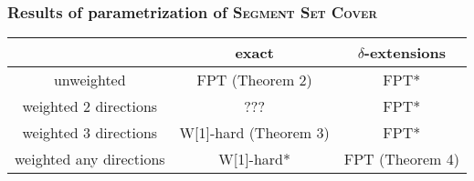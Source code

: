 \documentclass{beamer}
\begin{document}
\begin{frame}
\frametitle{Results of parametrization of \textsc{Segment Set Cover}}

\begin{tabular}{|c|c|c|}
\hline
           & exact & $\delta$-extensions \\
\hline
unweighted & \textcolor{olivegreen}{FPT (Theorem 2)} & \textcolor{olivegreen}{FPT*} \\
\hline
weighted 2 directions & ??? & \textcolor{olivegreen}{FPT*} \\
\hline
weighted 3 directions & \textcolor{olivegreen}{W[1]-hard (Theorem 3)} &  \textcolor{olivegreen}{FPT*}\\
\hline
weighted any directions & \textcolor{olivegreen}{W[1]-hard*} &  \textcolor{olivegreen}{FPT (Theorem 4)}\\
\hline
\end{tabular}

\end{frame}



\end{document}
